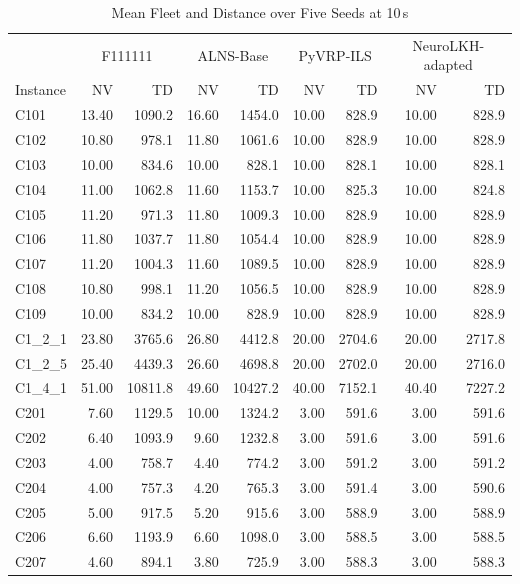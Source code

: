 \documentclass{article}
\begin{document}
{\begin{longtable}{l r r r r r r r r }
\caption{Mean Fleet and Distance over Five Seeds at 10\,s} \\
\toprule
& \multicolumn{2}{c}{F111111} & \multicolumn{2}{c}{ALNS-Base} & \multicolumn{2}{c}{PyVRP-ILS} & \multicolumn{2}{c}{NeuroLKH-adapted} \\
Instance & NV & TD & NV & TD & NV & TD & NV & TD \\
\midrule
\endhead
C101 & 13.40 & 1090.2 & 16.60 & 1454.0 & 10.00 & 828.9 & 10.00 & 828.9 \\
C102 & 10.80 & 978.1 & 11.80 & 1061.6 & 10.00 & 828.9 & 10.00 & 828.9 \\
C103 & 10.00 & 834.6 & 10.00 & 828.1 & 10.00 & 828.1 & 10.00 & 828.1 \\
C104 & 11.00 & 1062.8 & 11.60 & 1153.7 & 10.00 & 825.3 & 10.00 & 824.8 \\
C105 & 11.20 & 971.3 & 11.80 & 1009.3 & 10.00 & 828.9 & 10.00 & 828.9 \\
C106 & 11.80 & 1037.7 & 11.80 & 1054.4 & 10.00 & 828.9 & 10.00 & 828.9 \\
C107 & 11.20 & 1004.3 & 11.60 & 1089.5 & 10.00 & 828.9 & 10.00 & 828.9 \\
C108 & 10.80 & 998.1 & 11.20 & 1056.5 & 10.00 & 828.9 & 10.00 & 828.9 \\
C109 & 10.00 & 834.2 & 10.00 & 828.9 & 10.00 & 828.9 & 10.00 & 828.9 \\
C1\_2\_1 & 23.80 & 3765.6 & 26.80 & 4412.8 & 20.00 & 2704.6 & 20.00 & 2717.8 \\
C1\_2\_5 & 25.40 & 4439.3 & 26.60 & 4698.8 & 20.00 & 2702.0 & 20.00 & 2716.0 \\
C1\_4\_1 & 51.00 & 10811.8 & 49.60 & 10427.2 & 40.00 & 7152.1 & 40.40 & 7227.2 \\
C201 & 7.60 & 1129.5 & 10.00 & 1324.2 & 3.00 & 591.6 & 3.00 & 591.6 \\
C202 & 6.40 & 1093.9 & 9.60 & 1232.8 & 3.00 & 591.6 & 3.00 & 591.6 \\
C203 & 4.00 & 758.7 & 4.40 & 774.2 & 3.00 & 591.2 & 3.00 & 591.2 \\
C204 & 4.00 & 757.3 & 4.20 & 765.3 & 3.00 & 591.4 & 3.00 & 590.6 \\
C205 & 5.00 & 917.5 & 5.20 & 915.6 & 3.00 & 588.9 & 3.00 & 588.9 \\
C206 & 6.60 & 1193.9 & 6.60 & 1098.0 & 3.00 & 588.5 & 3.00 & 588.5 \\
C207 & 4.60 & 894.1 & 3.80 & 725.9 & 3.00 & 588.3 & 3.00 & 588.3 \\

\end{longtable}}
\end{document}
